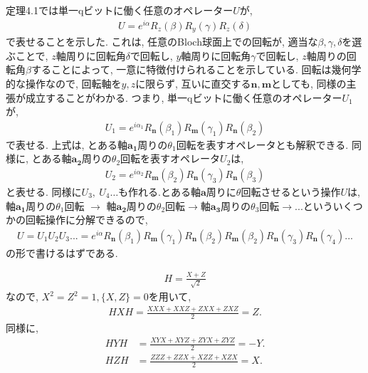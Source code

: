 \begin{ex}
    \label{ex4.11}
    定理4.1では単一qビットに働く任意のオペレーター$U$が,
    \begin{align*}
        U = e^{i \alpha} R_z(\beta)R_y(\gamma)R_z(\delta)
    \end{align*}
    で表せることを示した. これは, 任意のBloch球面上での回転が, 適当な$\beta, \gamma, \delta$を選ぶことで, $z$軸周りに回転角$\delta$で回転し, $y$軸周りに回転角$\gamma$で回転し, $z$軸周りの回転角$\beta$することによって, 一意に特徴付けられることを示している. 回転は幾何学的な操作なので, 回転軸を$y,z$に限らず, 互いに直交する$\bm{n}, \bm{m}$としても, 同様の主張が成立することがわかる. つまり, 単一qビットに働く任意のオペレーター$U_1$が,
    \begin{align*}
        U_1 = e^{i \alpha_1} R_{\bm{n}}(\beta_1)R_{\bm{m}}(\gamma_1)R_{\bm{n}}(\beta_2)
    \end{align*}
    で表せる. 上式は, とある軸$\bm{a_1}$周りの$\theta_1$回転を表すオペレータとも解釈できる. 同様に, とある軸$\bm{a_2}$周りの$\theta_2$回転を表すオペレータ$U_2$は,
    \begin{align*}
        U_2 = e^{i \alpha_2} R_{\bm{m}}(\beta_2)R_{\bm{n}}(\gamma_3)R_{\bm{n}}(\beta_3)
    \end{align*}
    と表せる. 同様に$U_3, \ U_4 \dots$も作れる.とある軸$\bm{a}$周りに$\theta$回転させるという操作$U$は, 軸$\bm{a_1}$周りの$\theta_1$回転 $\to$ 軸$\bm{a_2}$周りの$\theta_2$回転$\to$軸$\bm{a_3}$周りの$\theta_3$回転$\to ...$といういくつかの回転操作に分解できるので,
    \begin{align*}
        U = U_1 U_2 U_3 ... = e^{i \alpha} R_{\bm{n}}(\beta_1)R_{\bm{m}}(\gamma_1)R_{\bm{n}}(\beta_2)R_{\bm{m}}(\beta_2)R_{\bm{n}}(\gamma_3)R_{\bm{n}}(\gamma_4) ...
    \end{align*}
    の形で書けるはずである.
\end{ex}

\begin{ex}
    \label{ex4.12}

\end{ex}

\begin{ex}
    \label{ex4.13}
    \begin{align*}
        H = \frac{X + Z}{\sqrt{2}}
    \end{align*}
    なので, $X^2=Z^2=1, \{X,Z\} = 0$を用いて,
    \begin{align*}
        HXH = \frac{XXX + XXZ + ZXX + ZXZ}{2} = Z.
    \end{align*}
    同様に,
    \begin{align*}
        HYH & = \frac{XYX + XYZ + ZYX + ZYZ}{2} = -Y. \\
        HZH & = \frac{ZZZ + ZZX + XZZ + XZX}{2}= X.
    \end{align*}
\end{ex}

